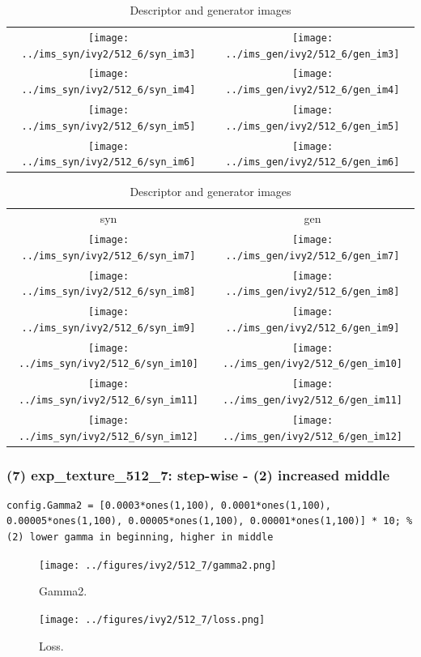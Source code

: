 \documentclass[letter]{article}
\begin{document}
\begin{table}[h!]
\begin{tabular}{cc}
		\texttt{[image: ../ims\_syn/ivy2/512\_6/syn\_im3]} & \texttt{[image: ../ims\_gen/ivy2/512\_6/gen\_im3]} \tabularnewline
		\texttt{[image: ../ims\_syn/ivy2/512\_6/syn\_im4]} & \texttt{[image: ../ims\_gen/ivy2/512\_6/gen\_im4]} \tabularnewline
		\texttt{[image: ../ims\_syn/ivy2/512\_6/syn\_im5]} & \texttt{[image: ../ims\_gen/ivy2/512\_6/gen\_im5]} \tabularnewline
		\texttt{[image: ../ims\_syn/ivy2/512\_6/syn\_im6]} & \texttt{[image: ../ims\_gen/ivy2/512\_6/gen\_im6]} \tabularnewline
	\end{tabular}
	\begin{tabular}{cc}
		syn & gen\tabularnewline
		\texttt{[image: ../ims\_syn/ivy2/512\_6/syn\_im7]} & \texttt{[image: ../ims\_gen/ivy2/512\_6/gen\_im7]} \tabularnewline
		\texttt{[image: ../ims\_syn/ivy2/512\_6/syn\_im8]} & \texttt{[image: ../ims\_gen/ivy2/512\_6/gen\_im8]} \tabularnewline
		\texttt{[image: ../ims\_syn/ivy2/512\_6/syn\_im9]} & \texttt{[image: ../ims\_gen/ivy2/512\_6/gen\_im9]} \tabularnewline
		\texttt{[image: ../ims\_syn/ivy2/512\_6/syn\_im10]} & \texttt{[image: ../ims\_gen/ivy2/512\_6/gen\_im10]} \tabularnewline
		\texttt{[image: ../ims\_syn/ivy2/512\_6/syn\_im11]} & \texttt{[image: ../ims\_gen/ivy2/512\_6/gen\_im11]} \tabularnewline
		\texttt{[image: ../ims\_syn/ivy2/512\_6/syn\_im12]} & \texttt{[image: ../ims\_gen/ivy2/512\_6/gen\_im12]} \tabularnewline
	\end{tabular}
	\caption{Descriptor and generator images}
\end{table}
\newpage

\subsubsection*{(7) exp\_texture\_512\_7: step-wise - (2) increased middle}

\begin{lstlisting}
config.Gamma2 = [0.0003*ones(1,100), 0.0001*ones(1,100), 0.00005*ones(1,100), 0.00005*ones(1,100), 0.00001*ones(1,100)] * 10; % (2) lower gamma in beginning, higher in middle 

\end{lstlisting}

\begin{figure}[h!]
	\centering
	\texttt{[image: ../figures/ivy2/512\_7/gamma2.png]}
	\caption{\label{fig:gamma1}Gamma2.}
\end{figure}

\begin{figure}[h!]
	\centering
	\texttt{[image: ../figures/ivy2/512\_7/loss.png]}
	\caption{\label{fig:gamma1}Loss.}
\end{figure}
\end{document}
